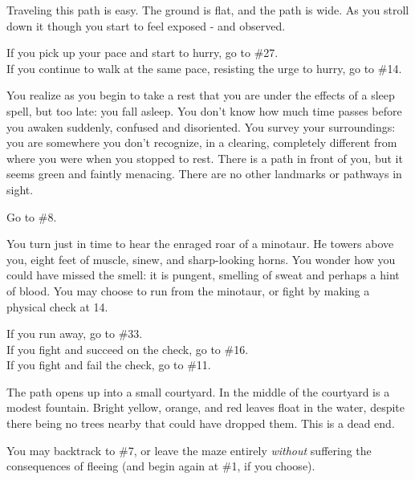 \documentclass[green]{gl2018}
\begin{document}
\begin{LARGE}
\begin{location}{34}
\begin{fromhere}
\end{fromhere}
\end{location}
\begin{location}{35}
Traveling this path is easy. The ground is flat, and the path is wide. As you stroll down it though you start to feel exposed - and observed. 
\begin{fromhere}If you pick up your pace and start to hurry, go to \#27.\\
 If you continue to walk at the same pace, resisting the urge to hurry, go to \#14.
\end{fromhere}
\end{location}
\begin{location}{36}
You realize as you begin to take a rest that you are under the effects of a sleep spell, but too late: you fall asleep.  You don't know how much time passes before you awaken suddenly, confused and disoriented.  You survey your surroundings: you are somewhere you don't recognize, in a clearing, completely different from where you were when you stopped to rest.  There is a path in front of you, but it seems green and faintly menacing.  There are no other landmarks or pathways in sight.
\begin{fromhere}Go to \#8.\end{fromhere}
\end{location}
\begin{location}{37}
You turn just in time to hear the enraged roar of a minotaur.  He towers above you, eight feet of muscle, sinew, and sharp-looking horns.  You wonder how you could have missed the smell: it is pungent, smelling of sweat and perhaps a hint of blood.  You may choose to run from the minotaur, or fight by making a physical check at 14.
\begin{fromhere}
  If you run away, go to \#33.\\
If you fight and succeed on the check, go to \#16. \\
 If you fight and fail the check, go to \#11.
\end{fromhere}
\end{location}
\begin{location}{38}
The path opens up into a small courtyard. In the middle of the courtyard is a modest fountain.  Bright yellow, orange, and red leaves float in the water, despite there being no trees nearby that could have dropped them. This is a dead end.
\begin{fromhere} You may backtrack to \#7, or leave the maze entirely {\em without} suffering the consequences of fleeing (and begin again at \#1, if you choose).

\end{fromhere}
\end{location}
\end{LARGE}
\end{document}
